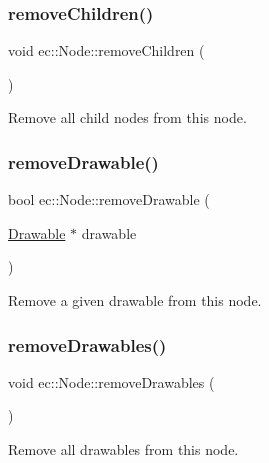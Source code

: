 \subsubsection{\texorpdfstring{remove\+Children()}{removeChildren()}}
{\footnotesize\ttfamily void ec\+::\+Node\+::remove\+Children (\begin{DoxyParamCaption}{ }\end{DoxyParamCaption})}



Remove all child nodes from this node. 

\mbox{\label{classec_1_1_node_a20231d84c538f7dea43836b3e44376a7}} 
\subsubsection{\texorpdfstring{remove\+Drawable()}{removeDrawable()}}
{\footnotesize\ttfamily bool ec\+::\+Node\+::remove\+Drawable (\begin{DoxyParamCaption}\item[{\mbox{\hyperlink{classec_1_1_drawable}{Drawable}} $\ast$}]{drawable }\end{DoxyParamCaption})}



Remove a given drawable from this node. 

\mbox{\label{classec_1_1_node_a57fd7f0d158527df372880399ca48002}} 
\subsubsection{\texorpdfstring{remove\+Drawables()}{removeDrawables()}}
{\footnotesize\ttfamily void ec\+::\+Node\+::remove\+Drawables (\begin{DoxyParamCaption}{ }\end{DoxyParamCaption})}



Remove all drawables from this node. 

\mbox{\label{classec_1_1_node_add44dc77d499886e9c75a0e1c1e446cf}} 
